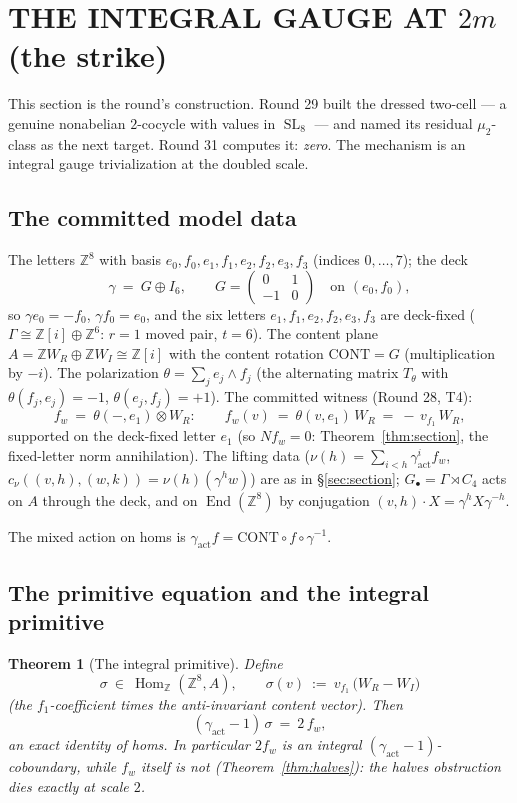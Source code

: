 \documentclass[11pt]{article}
\newcommand{\Z}{\mathbb Z}
\newcommand{\Hom}{\operatorname{Hom}}
\newcommand{\SL}{\operatorname{SL}}
\newcommand{\End}{\operatorname{End}}
\newtheorem{theorem}{Theorem}[section]
\begin{document}
\section{THE INTEGRAL GAUGE AT $2m$ (the strike)}\label{sec:gauge}

This section is the round's construction. Round 29 built the dressed
two-cell --- a genuine nonabelian $2$-cocycle with values in
$\SL_8$ --- and named its residual $\mu_2$-class as the next target.
Round 31 computes it: \emph{zero}. The mechanism is an integral gauge
trivialization at the doubled scale.

\subsection{The committed model data}\label{sec:committed}

The letters $\Z^8$ with basis
$e_0,f_0,e_1,f_1,e_2,f_2,e_3,f_3$ (indices $0,\dots,7$); the deck
\[
\gamma\ =\ G\oplus I_6,\qquad
G=\begin{pmatrix}0&1\\-1&0\end{pmatrix}\quad\text{on }(e_0,f_0),
\]
so $\gamma e_0=-f_0$, $\gamma f_0=e_0$, and the six letters
$e_1,f_1,e_2,f_2,e_3,f_3$ are deck-fixed ($\Gamma\cong\Z[i]\oplus\Z^6$:
$r=1$ moved pair, $t=6$). The content plane
$A=\Z W_R\oplus\Z W_I\cong\Z[i]$ with the content rotation
$\mathrm{CONT}=G$ (multiplication by $-i$). The polarization
$\theta=\sum_j e_j\wedge f_j$ (the alternating matrix $T_\theta$ with
$\theta(f_j,e_j)=-1$, $\theta(e_j,f_j)=+1$). The committed witness
(Round 28, T4):
\[
f_w\ =\ \theta(-,e_1)\otimes W_R:\qquad
f_w(v)\ =\ \theta(v,e_1)\,W_R\ =\ -\,v_{f_1}\,W_R,
\]
supported on the deck-fixed letter $e_1$ (so $Nf_w=0$:
Theorem~\ref{thm:section}, the fixed-letter norm annihilation). The
lifting data ($\nu(h)=\sum_{i<h}\gamma_{\mathrm{act}}^if_w$,
$c_\nu((v,h),(w,k))=\nu(h)(\gamma^hw)$) are as in
\S\ref{sec:section}; $G_\bullet=\Gamma\rtimes C_4$ acts on $A$
through the deck, and on $\End(\Z^8)$ by conjugation
$(v,h)\cdot X=\gamma^hX\gamma^{-h}$.

The mixed action on homs is
$\gamma_{\mathrm{act}}f=\mathrm{CONT}\circ f\circ\gamma^{-1}$.

\subsection{The primitive equation and the integral primitive}

\begin{theorem}[The integral primitive]\label{thm:primitive}
Define
\[
\sigma\ \in\ \Hom_\Z(\Z^8,A),\qquad
\sigma(v)\ :=\ v_{f_1}\,\bigl(W_R-W_I\bigr)
\]
(the $f_1$-coefficient times the anti-invariant content vector). Then
\[
(\gamma_{\mathrm{act}}-1)\,\sigma\ =\ 2\,f_w,
\]
an exact identity of homs. In particular $2f_w$ is an integral
$(\gamma_{\mathrm{act}}-1)$-coboundary, while $f_w$ itself is not
(Theorem~\ref{thm:halves}): the halves obstruction dies exactly at
scale $2$.
\end{theorem}
\end{document}
